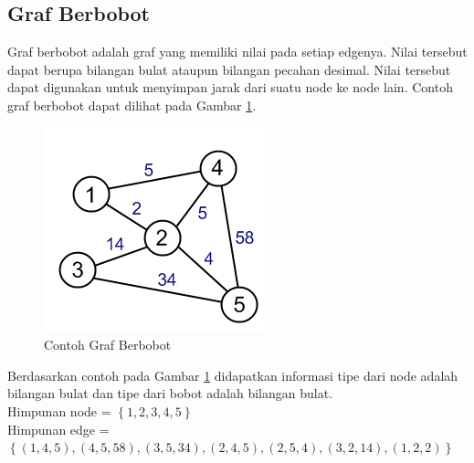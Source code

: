\subsection{Graf Berbobot}
Graf berbobot adalah graf yang memiliki nilai pada setiap edgenya. Nilai
tersebut dapat berupa bilangan bulat ataupun bilangan pecahan desimal. Nilai
tersebut dapat digunakan untuk menyimpan jarak dari suatu node ke node lain.
Contoh graf berbobot dapat dilihat pada Gambar \ref{fig:weight_graph}.
\begin{figure}[h]
\centering
\includegraphics[scale=0.95]{Gambar/weight_graph}
\caption[Contoh Graf Berbobot]{Contoh Graf Berbobot}
\label{fig:weight_graph}
\end{figure}
Berdasarkan contoh pada Gambar \ref{fig:weight_graph}  didapatkan informasi tipe
dari node adalah bilangan bulat dan tipe dari bobot adalah bilangan bulat. \\
Himpunan node = $\left\{ 1,2,3,4,5 \right\}$ \\ 
Himpunan edge = $\left\{ (1,4,5) ,(4,5,58) ,(3,5,34) ,(2,4,5) ,(2,5,4) ,(3,2,14)
,(1,2,2) \right\}$

